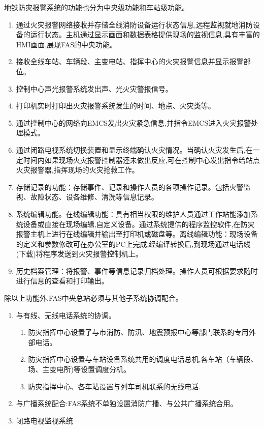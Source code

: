 地铁防灾报警系统的功能也分为中央级功能和车站级功能。
\begin{enumerate}
	\item 通过火灾报警网络接收并存储全线消防设备运行状态信息,远程监视就地消防设备的运行状态。主机通过显示画面和数据表格提供现场的监视信息,具有丰富的HMI画面,展现FAS的中央功能。
	\item 接收全线车站、车辆段、主变电站、指挥中心的火灾报警信息并显示报警部位。
	\item 控制中心声光报警系统发出声、光火灾警报信号。
	\item 打印机实时打印出火灾报警系统发生的时间、地点、火灾类等。
	\item 通过控制中心的网络向EMCS发出火灾紧急信息,并指令EMCS进入火灾报警处理模式。
	\item 通过闭路电视系统切换装置和显示终端确认火灾情况。当确认火灾发生后,在一定时间内如果现场火灾报警控制器还未做出反应,可在控制中心发出指令给站点火灾报警器,指挥现场的火灾抢救工作。
	\item 存储记录的功能：存储事件、记录和操作人员的各项操作记录。包括火警监视、故障状态、设各维修、清洗等信息记录。
	\item 系统编辑功能。在线编辑功能：具有相当权限的维护人员通过工作站能添加系统设备或直接在现场编辑,自定义设备。通过系统提供的程序监控软件,在防灾报警主机上进行在线编辑并输出至打印机或磁盘等。离线编辑功能：现场设备的定义和参数修改可在办公室的PC上完成,经编译转换后,到现场通过电话线(下载)将程序发送到火灾报警控制机上。 
	\item 历史档案管理：将报警、事件等信息记录归档处理。操作人员可根据要求随时进行信息的查看和打印输出。
\end{enumerate}

除以上功能外,FAS中央总站必须与其他子系统协调配合。
\begin{enumerate}
	\item 与有线、无线电话系统的协调。
	\begin{enumerate}
		\item 防灾指挥中心设置了与市消防、防汛、地震预报中心等部门联系的专用外部电话。
		\item 防灾指挥中心设置与车站设备系统共用的调度电话总机,各车站（车辆段、场、主变电所)等设置调度分机。
		\item 防灾指挥中心、各车站设置与列车司机联系的无线电话.
	\end{enumerate}
	\item 与广播系统配合:FAS系统不单独设置消防广播、与公共广播系统合用。
	\item 闭路电视监视系统
\end{enumerate}

